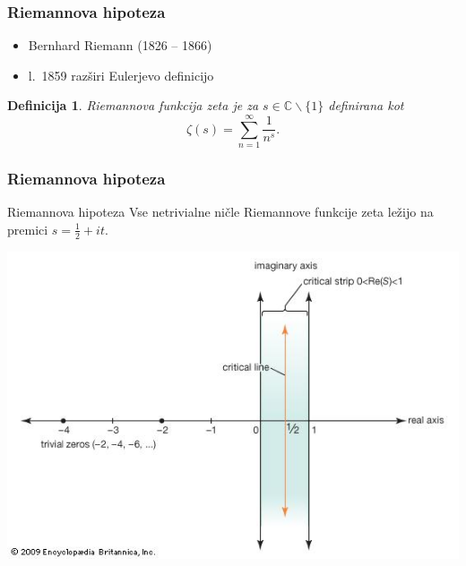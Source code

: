 \documentclass{beamer}
\newtheorem{definicija}{Definicija}
\begin{document}

\begin{frame}
\frametitle{Riemannova hipoteza}

\begin{itemize}
\item Bernhard Riemann (1826 -- 1866)
\item l.~1859 razširi Eulerjevo definicijo
\end{itemize}

\begin{definicija}
\emph{Riemannova funkcija zeta} je za
 $s\in\mathbb{C}\backslash\{1\}$
definirana kot
\[ \zeta(s) = \sum_{n=1}^{\infty}\frac{1}{n^s}. \]
\end{definicija}

\end{frame}


\begin{frame}
\frametitle{Riemannova hipoteza}

\begin{block}{Riemannova hipoteza}
Vse netrivialne ničle Riemannove funkcije zeta ležijo na premici $s=\frac{1}{2}+it$.
\end{block}

\begin{center}
\includegraphics[scale=0.3]{zeta-funkcija.png}
\end{center}

\end{frame}

\end{document}
